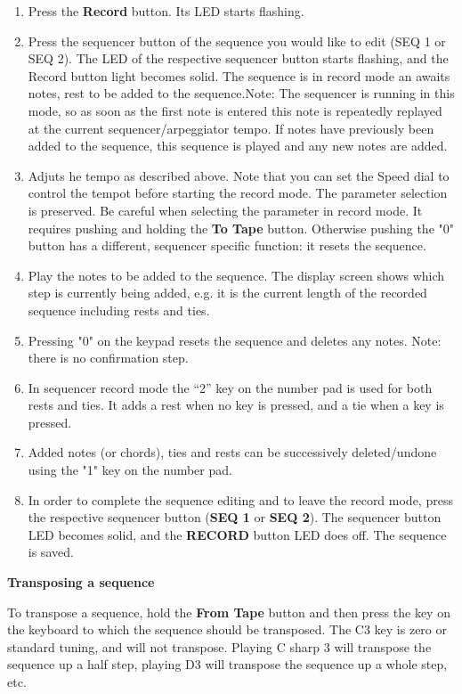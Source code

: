 \begin{enumerate}
  \item Press the \textbf{Record} button. Its LED starts flashing.
  \item Press the sequencer button of the sequence you would like to edit (SEQ 1 or SEQ 2). The LED of the respective sequencer button starts flashing, and the Record button light becomes solid. The sequence is in record mode an awaits notes, rest to be added to the sequence.Note: The sequencer is running in this mode, so as soon as the first note is entered this note is repeatedly replayed at the current sequencer/arpeggiator tempo. If notes have previously been added to the sequence, this sequence is played and any new notes are added. 
  \item Adjuts he tempo as described above. Note that you can set the Speed dial to control the tempot before starting the record mode. The parameter selection is preserved. Be careful when selecting the parameter in record mode. It requires pushing and holding  the \textbf{To Tape} button. Otherwise pushing the "0" button has a different, sequencer specific function: it resets the sequence.  
  \item Play the notes to be added to the sequence. The display screen shows which step is currently being added, e.g. it is the current length of the recorded sequence including rests and ties.
  \item Pressing "0" on the keypad resets the sequence and deletes any notes. Note: there is no confirmation step. 
  \item In sequencer record mode the “2” key on the number pad is used for both rests and ties. It adds a rest when no key is pressed, and a tie when a key is pressed.
  \item Added notes (or chords), ties and rests can be successively deleted/undone using the "1" key on the number pad. 
  \item In order to complete the sequence editing and to leave the record mode, press the respective sequencer button (\textbf{SEQ 1} or \textbf{SEQ 2}). The sequencer button LED becomes solid, and the \textbf{RECORD} button LED does off. The sequence is saved. 
\end{enumerate}

\textbf{Transposing a  sequence}

To transpose a sequence, hold the \textbf{From Tape} button and then press the key on the keyboard to which the sequence should be transposed. The C3 key is zero or standard tuning, and will not transpose. Playing C sharp 3 will transpose the sequence up a half step, playing D3 will transpose the sequence up a whole step, etc.
